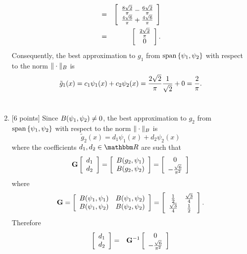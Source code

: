 \begin{solution}
\begin{enumerate}
\begin{eqnarray*}
\\
&=&\left[\begin{array}{c}{8\sqrt{2}\over\pi}-{6\sqrt{2}\over\pi}\\{4\sqrt{6}\over\pi}+{4\sqrt{6}\over \pi}\end{array}\right]
\\
&=&\left[\begin{array}{c}{2\sqrt{2}\over\pi}\\0\end{array}\right].
\end{eqnarray*}
Consequently, the best approximation to $g_1$ from ${\rm span}\left\{\psi_1,\psi_2\right\}$ with respect to the norm $\|\cdot\|_B$ is
\[
\tilde{g}_1(x)=c_1\psi_1(x)+c_2\psi_2(x)={2\sqrt{2}\over\pi}{1\over\sqrt{2}}+0={2\over\pi}.
\]
\\
\item {[6 points]} Since $B(\psi_1,\psi_2)\ne0$, the best approximation to $g_2$ from ${\rm span}\left\{\psi_1,\psi_2\right\}$ with respect to the norm $\|\cdot\|_B$ is
\[
\tilde{g}_2(x)=d_1\psi_1(x)+d_2\psi_2(x)
\]
where the coefficients $d_1,d_2\in\R$ are such that
\[
{\bf G}\left[\begin{array}{c}d_1 \\ d_2\end{array}\right]=\left[\begin{array}{c}B(g_2,\psi_1) \\ B(g_2,\psi_2)\end{array}\right]=\left[\begin{array}{c}0 \\ -{\sqrt{6}\over \pi^2}\end{array}\right]
\]
where
\[
{\bf G}=\left[\begin{array}{cc} B(\psi_1,\psi_1) & B(\psi_1,\psi_2) \\ B(\psi_1,\psi_2) & B(\psi_2,\psi_2)\end{array}\right]=\left[\begin{array}{cc} {1\over 2} & {\sqrt{3}\over 4} \\ {\sqrt{3}\over 4} & {1\over 2}\end{array}\right].
\]
Therefore
\begin{eqnarray*}
\left[\begin{array}{c}d_1 \\ d_2\end{array}\right]&=&\BG^{-1}\left[\begin{array}{c}0 \\ -{\sqrt{6}\over \pi^2}\end{array}\right]

\end{eqnarray*}
\end{enumerate}
\end{solution}
